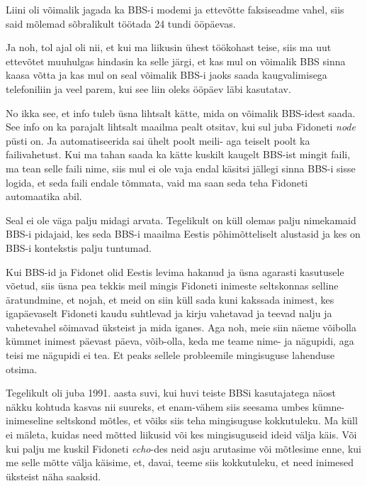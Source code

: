 Liini oli võimalik jagada ka BBS-i modemi ja ettevõtte faksiseadme vahel, siis said
mõlemad sõbralikult töötada 24 tundi ööpäevas.

Ja noh, tol ajal oli nii, et kui ma liikusin ühest töökohast teise, siis 
ma uut ettevõtet muuhulgas hindasin ka selle järgi, et kas mul on võimalik 
BBS sinna kaasa võtta ja kas mul on seal võimalik  BBS-i jaoks saada  
kaugvalimisega telefoniliin ja veel parem, kui see liin oleks  ööpäev läbi 
 kasutatav.


No ikka see, et info tuleb üsna lihtsalt kätte, mida on võimalik BBS-idest saada. 
See info on ka parajalt lihtsalt maailma pealt otsitav, kui sul juba Fidoneti \emph{node} püsti 
on. Ja automatiseerida sai ühelt poolt meili-  aga teiselt poolt ka 
failivahetust. Kui ma tahan saada ka kätte kuskilt kaugelt BBS-ist mingit 
faili, ma tean selle faili nime, siis mul ei ole vaja endal käsitsi jällegi 
sinna BBS-i sisse logida, et seda faili endale tõmmata, vaid ma saan seda teha 
Fidoneti automaatika abil.


Seal ei ole väga palju midagi arvata. Tegelikult on küll olemas palju nimekamaid 
BBS-i pidajaid, kes seda  BBS-i maailma Eestis põhimõtteliselt  alustasid ja 
kes on BBS-i kontekstis palju tuntumad.

Kui  BBS-id ja Fidonet  olid Eestis 
levima hakanud ja üsna agarasti kasutusele võetud, siis üsna pea tekkis meil 
mingis Fidoneti inimeste seltskonnas  selline äratundmine, et nojah, et meid on 
siin küll  sada kuni kakssada inimest, kes igapäevaselt   Fidoneti 
kaudu suhtlevad ja kirju vahetavad ja teevad nalju ja vahetevahel sõimavad 
üksteist ja mida iganes. Aga noh, meie siin  näeme võibolla kümmet inimest päevast 
päeva, võib-olla, keda me teame nime- ja nägupidi, aga teisi me nägupidi ei tea. Et 
peaks sellele probleemile mingisuguse lahenduse otsima. 

Tegelikult oli juba 1991. aasta suvi, kui huvi teiste BBSi kasutajatega näost näkku kohtuda kasvas nii suureks, 
et enam-vähem siis seesama  umbes kümne-inimeseline seltskond mõtles, et võiks siis 
teha mingisuguse kokkutuleku. Ma küll ei mäleta, kuidas need mõtted 
liikusid või kes mingisuguseid ideid välja käis. Või kui palju me kuskil 
Fidoneti \emph{echo}-des neid asju arutasime või mõtlesime enne, kui me selle 
mõtte välja käisime, et, davai, teeme siis kokkutuleku, et need inimesed
üksteist näha saaksid.

